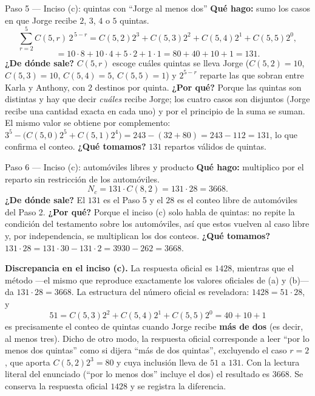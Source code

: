 \documentclass[11pt]{article}
\begin{document}
\begin{paso}{Paso 5 --- Inciso (c): quintas con ``Jorge al menos dos''}
\textbf{Qué hago:} sumo los casos en que Jorge recibe $2$, $3$, $4$ o $5$ quintas.
\[
\sum_{r=2}^{5}C(5,r)\,2^{\,5-r}=C(5,2)2^3+C(5,3)2^2+C(5,4)2^1+C(5,5)2^0 ,
\]
\[
=10\cdot 8+10\cdot 4+5\cdot 2+1\cdot 1=80+40+10+1=131 .
\]
\textbf{¿De dónde sale?} $C(5,r)$ escoge cuáles quintas se lleva Jorge ($C(5,2)=10$, $C(5,3)=10$, $C(5,4)=5$, $C(5,5)=1$) y $2^{5-r}$ reparte las que sobran entre Karla y Anthony, con $2$ destinos por quinta.
\textbf{¿Por qué?} Porque las quintas son distintas y hay que decir \emph{cuáles} recibe Jorge; los cuatro casos son disjuntos (Jorge recibe una cantidad exacta en cada uno) y por el principio de la suma se suman. El mismo valor se obtiene por complemento: $3^5-\bigl(C(5,0)2^5+C(5,1)2^4\bigr)=243-(32+80)=243-112=131$, lo que confirma el conteo.
\textbf{¿Qué tomamos?} $131$ repartos válidos de quintas.
\end{paso}

\begin{paso}{Paso 6 --- Inciso (c): automóviles libres y producto}
\textbf{Qué hago:} multiplico por el reparto sin restricción de los automóviles.
\[
N_c=131\cdot C(8,2)=131\cdot 28=3668 .
\]
\textbf{¿De dónde sale?} El $131$ es el Paso 5 y el $28$ es el conteo libre de automóviles del Paso 2.
\textbf{¿Por qué?} Porque el inciso (c) solo habla de quintas: no repite la condición del testamento sobre los automóviles, así que estos vuelven al caso libre y, por independencia, se multiplican los dos conteos.
\textbf{¿Qué tomamos?} $131\cdot 28=131\cdot 30-131\cdot 2=3930-262=3668$.
\end{paso}

\begin{nota}
\textbf{Discrepancia en el inciso (c).} La respuesta oficial es $1428$, mientras que el método —el mismo que reproduce exactamente los valores oficiales de (a) y (b)— da $131\cdot 28=3668$. La estructura del número oficial es reveladora: $1428=51\cdot 28$, y
\[
51=C(5,3)2^2+C(5,4)2^1+C(5,5)2^0=40+10+1
\]
es precisamente el conteo de quintas cuando Jorge recibe \textbf{más de dos} (es decir, al menos tres). Dicho de otro modo, la respuesta oficial corresponde a leer ``por lo menos dos quintas'' como si dijera ``más de dos quintas'', excluyendo el caso $r=2$, que aporta $C(5,2)2^3=80$ y cuya inclusión lleva de $51$ a $131$. Con la lectura literal del enunciado (``por lo menos dos'' incluye el dos) el resultado es $3668$. Se conserva la respuesta oficial $1428$ y se registra la diferencia.
\end{nota}
\end{document}
